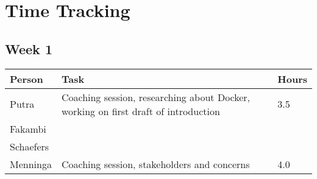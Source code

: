 \chapter{Time Tracking}
\label{App: Time Tracking}

\section*{Week 1}
\begin{longtable}{p{} p{} p{}}
	\textbf{Person} & \textbf{Task} & \textbf{Hours} \\ \toprule
	Putra           & Coaching session, researching about Docker, working on first draft of introduction 	& 3.5	\\ \midrule
	Fakambi         &	&	\\ \midrule
	Schaefers       & 	& 	\\ \midrule
	Menninga        & Coaching session, stakeholders and concerns & 4.0 \\ \bottomrule
\end{longtable}